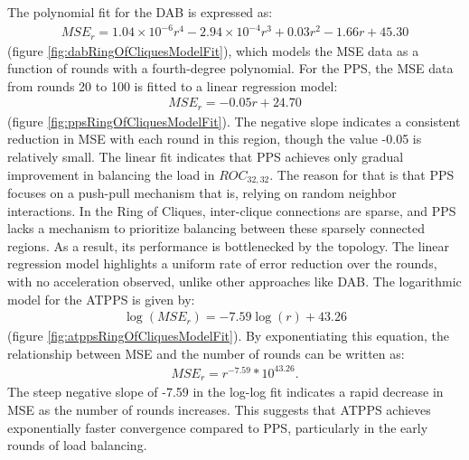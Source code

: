 The polynomial fit for the DAB is expressed as:
\begin{align}
    MSE_r=1.04\times 10^{-6}r^{4}-2.94\times 10^{-4}r^{3}+0.03r^{2}-1.66r+45.30    
\end{align}
(figure \ref{fig:dabRingOfCliquesModelFit}), which models the MSE data as a function of rounds with a fourth-degree polynomial. For the PPS, the MSE data from rounds 20 to 100 is fitted to a linear regression model:
\begin{align}
    MSE_r=-0.05r+24.70
\end{align}
(figure \ref{fig:ppsRingOfCliquesModelFit}). The negative slope indicates a consistent reduction in MSE with each round in this region, though the value -0.05 is relatively small. The linear fit indicates that PPS achieves only gradual improvement in balancing the load in $ROC_{32,32}$. The reason for that is that PPS focuses on a push-pull mechanism that is, relying on random neighbor interactions. In the Ring of Cliques, inter-clique connections are sparse, and PPS lacks a mechanism to prioritize balancing between these sparsely connected regions. As a result, its performance is bottlenecked by the topology. The linear regression model highlights a uniform rate of error reduction over the rounds, with no acceleration observed, unlike other approaches like DAB. The logarithmic model for the ATPPS is given by: 
\begin{align}
    \log{(MSE_r)}=-7.59\log{(r)}+43.26   
\end{align}
(figure \ref{fig:atppsRingOfCliquesModelFit}). By exponentiating this equation, the relationship between MSE and the number of rounds can be written as:
\begin{align}
    MSE_r=r^{-7.59}*10^{43.26}.    
\end{align}
The steep negative slope of -7.59 in the log-log fit indicates a rapid decrease in MSE as the number of rounds increases. This suggests that ATPPS achieves exponentially faster convergence compared to PPS, particularly in the early rounds of load balancing.

